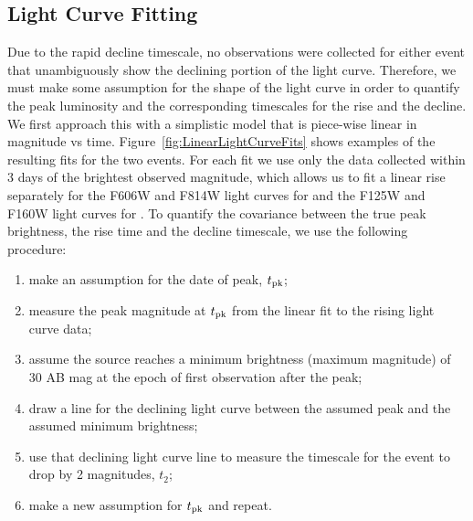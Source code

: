 \subsection{Light Curve Fitting}\label{sec:LightCurves}

Due to the rapid decline timescale, no observations were collected for
either event that unambiguously show the declining portion of the
light curve. Therefore, we must make some assumption for the shape of
the light curve in order to quantify the peak luminosity and the
corresponding timescales for the rise and the decline.  We first
approach this with a simplistic model that is piece-wise linear in
magnitude vs time.  Figure~\ref{fig:LinearLightCurveFits} shows
examples of the resulting fits for the two events.  For each fit we
use only the data collected within 3 days of the brightest observed
magnitude, which allows us to fit a linear rise separately for the
F606W and F814W light curves for \spockone and the F125W and F160W
light curves for \spocktwo. To quantify the covariance between the
true peak brightness, the rise time and the decline timescale, we use
the following procedure:

\begin{enumerate}
\item make an assumption for the date of peak, $t_{\rm pk}$;
\item measure the peak magnitude at $t_{\rm pk}$ from the linear fit
  to the rising light curve data;
\item assume the source reaches a minimum brightness (maximum
  magnitude) of 30 AB mag at the epoch of first observation after the
  peak;
\item draw a line for the declining light curve between the assumed
  peak and the assumed minimum brightness;
\item use that declining light curve line to measure the timescale for
  the event to drop by 2 magnitudes, $t_2$;
\item make a new assumption for $t_{\rm pk}$ and repeat.
\end{enumerate}

